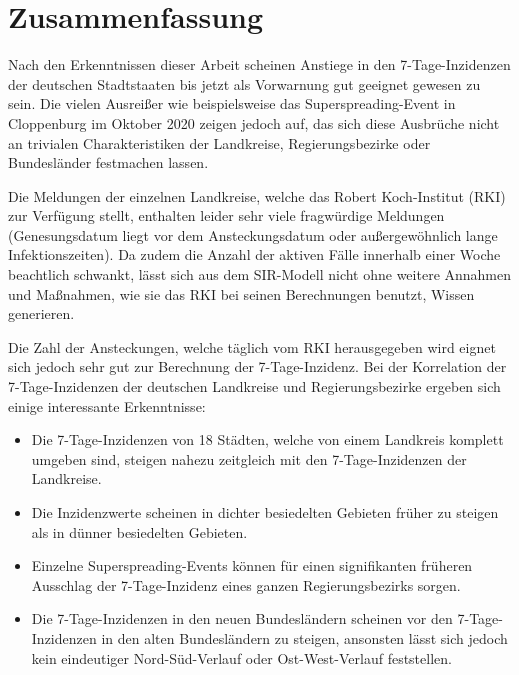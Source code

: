 \chapter{Zusammenfassung}\label{chap:Zusammenfassun}
Nach den Erkenntnissen dieser Arbeit scheinen Anstiege in den 7-Tage-Inzidenzen der deutschen Stadtstaaten bis jetzt als Vorwarnung gut geeignet gewesen zu sein. Die vielen Ausreißer wie beispielsweise das Superspreading-Event in Cloppenburg im Oktober 2020 zeigen jedoch auf, das sich diese Ausbrüche nicht an trivialen Charakteristiken der Landkreise, Regierungsbezirke oder Bundesländer festmachen lassen.

Die Meldungen der einzelnen Landkreise, welche das Robert Koch-Institut (RKI) zur Verfügung stellt, enthalten leider sehr viele fragwürdige Meldungen (Genesungsdatum liegt vor dem Ansteckungsdatum oder außergewöhnlich lange Infektionszeiten). Da zudem die Anzahl der aktiven Fälle innerhalb einer Woche beachtlich schwankt, lässt sich aus dem SIR-Modell nicht ohne weitere Annahmen und Maßnahmen, wie sie das RKI bei seinen Berechnungen benutzt, Wissen generieren.

Die Zahl der Ansteckungen, welche täglich vom RKI herausgegeben wird eignet sich jedoch sehr gut zur Berechnung der 7-Tage-Inzidenz.
Bei der Korrelation der 7-Tage-Inzidenzen der deutschen Landkreise und Regierungsbezirke ergeben sich einige interessante Erkenntnisse:
\begin{itemize}
    \item Die 7-Tage-Inzidenzen von 18 Städten, welche von einem Landkreis komplett umgeben sind, steigen nahezu zeitgleich mit den 7-Tage-Inzidenzen der Landkreise.
    \item Die Inzidenzwerte scheinen in dichter besiedelten Gebieten früher zu steigen als in dünner besiedelten Gebieten.
    \item Einzelne Superspreading-Events können für einen signifikanten früheren Ausschlag der 7-Tage-Inzidenz eines ganzen Regierungsbezirks sorgen.
    \item Die 7-Tage-Inzidenzen in den neuen Bundesländern scheinen vor den 7-Tage-Inzidenzen in den alten Bundesländern zu steigen, ansonsten lässt sich jedoch kein eindeutiger Nord-Süd-Verlauf oder Ost-West-Verlauf feststellen.
\end{itemize}